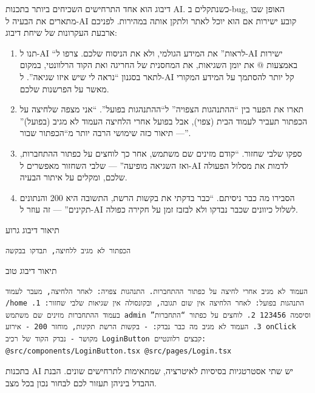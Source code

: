
דיבוג הוא אחד התרחישים השכיחים ביותר בתכנות AI. כשנתקלים ב-bug, האופן שבו מתארים את הבעיה ל-AI קובע ישירות אם הוא יוכל לאתר ולתקן אותה במהירות. לפניכם ארבעת העקרונות של שיחת דיבוג:

\begin{enumerate}
  \item תנו ל-AI “לראות” את המידע הגולמי, ולא את הניסוח שלכם. צרפו ל-AI ישירות באמצעות @ את יומן השגיאות, את המחסנית של החריגה ואת הקוד הרלוונטי, במקום לתאר בסגנון “נראה לי שיש איזו שגיאה”. ל-AI קל יותר להסתמך על המידע המקורי מאשר על הפרשנות שלכם.
  \item תארו את הפער בין “ההתנהגות הצפויה” ל“ההתנהגות בפועל”. “אני מצפה שלחיצה על הכפתור תעביר לעמוד הבית (צפוי), אבל בפועל אחרי הלחיצה העמוד לא מגיב (בפועל)” — תיאור כזה שימושי הרבה יותר מ“הכפתור שבור”.
  \item ספקו שלבי שחזור. “קודם מזינים שם משתמש, אחר כך לוחצים על כפתור ההתחברות, ואז השגיאה מופיעה” — שלבי השחזור מאפשרים ל-AI לדמות את מסלול הפעולה שלכם, ומקלים על איתור הבעיה.
  \item הסבירו מה כבר ניסיתם. “כבר בדקתי את בקשות הרשת, התשובה היא 200 והנתונים תקינים” — זה עוזר ל-AI לשלול כיוונים שכבר נבדקו ולא לבזבז זמן על חקירה כפולה.
\end{enumerate}

תיאור דיבוג גרוע

\begin{lstlisting}
הכפתור לא מגיב ללחיצה, תבדקו בבקשה
\end{lstlisting}

תיאור דיבוג טוב

\begin{lstlisting}
העמוד לא מגיב אחרי לחיצה על כפתור ההתחברות. התנהגות צפויה: לאחר הלחיצה, מעבר לעמוד /home התנהגות בפועל: לאחר הלחיצה אין שום תגובה, ובקונסולה אין שגיאות שלבי שחזור: 1. בעמוד ההתחברות מזינים שם משתמש admin וסיסמה 123456 2. לוחצים על כפתור “התחברות” 3. העמוד לא מגיב מה כבר נבדק: - בקשות הרשת תקינות, מוחזר 200 - אירוע onClick מקושר - נבדק הקוד של רכיב LoginButton קבצים רלוונטיים: @src/components/LoginButton.tsx @src/pages/Login.tsx
\end{lstlisting}


בתכנות AI יש שתי אסטרטגיות בסיסיות לאיטרציה, שמתאימות לתרחישים שונים. הבנת ההבדל ביניהן תעזור לכם לבחור נכון בכל מצב.


